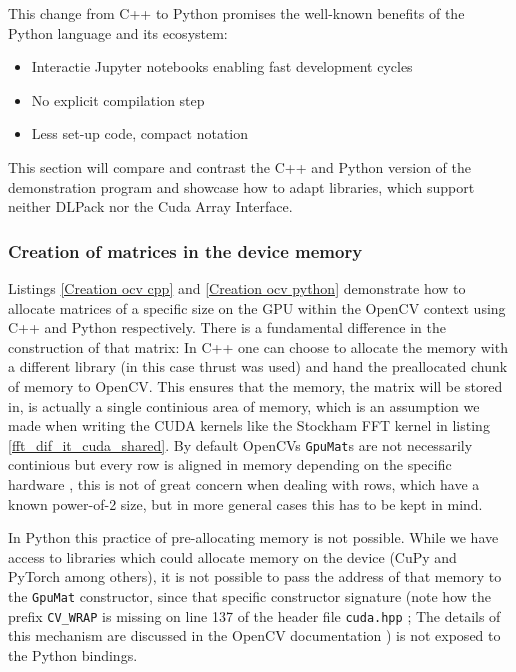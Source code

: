 \documentclass[english,11pt,a4paper,table]{article} %
\begin{document}
This change from C++ to Python promises the well-known benefits of the Python language and its ecosystem:

\begin{itemize}
	\item Interactie Jupyter notebooks enabling fast development cycles
	\item No explicit compilation step
	\item Less set-up code, compact notation
\end{itemize}

This section will compare and contrast the C++ and Python version of the demonstration program and showcase how to adapt libraries, which support neither DLPack nor the Cuda Array Interface.

\subsubsection{Creation of matrices in the device memory}

Listings \ref{Creation ocv cpp} and \ref{Creation ocv python} demonstrate how to allocate matrices of a specific size on the GPU within the OpenCV context using C++ and Python respectively.
There is a fundamental difference in the construction of that matrix: In C++ one can choose to allocate the memory with a different library (in this case thrust was used) and hand the preallocated chunk of memory to OpenCV.
This ensures that the memory, the matrix will be stored in, is actually a single continious area of memory, which is an assumption we made when writing the CUDA kernels like the Stockham FFT kernel in listing \ref{fft_dif_it_cuda_shared}. By default OpenCVs \texttt{GpuMat}s are not necessarily continious but every row is aligned in memory depending on the specific hardware \cite{OpenCVcv92:online}, this is not of great concern when dealing with rows, which have a known power-of-2 size, but in more general cases this has to be kept in mind.

In Python this practice of pre-allocating memory is not possible.
While we have access to libraries which could allocate memory on the device (CuPy and PyTorch among others), it is not possible to pass the address of that memory to the \texttt{GpuMat} constructor, since that specific constructor signature (note how the prefix \texttt{CV\_WRAP} is missing on line 137 of the header file \texttt{cuda.hpp} \cite{opencvcu60:online}; The details of this mechanism are discussed in the OpenCV documentation \cite{OpenCVHo82:online}) is not exposed to the Python bindings.
\end{document}
